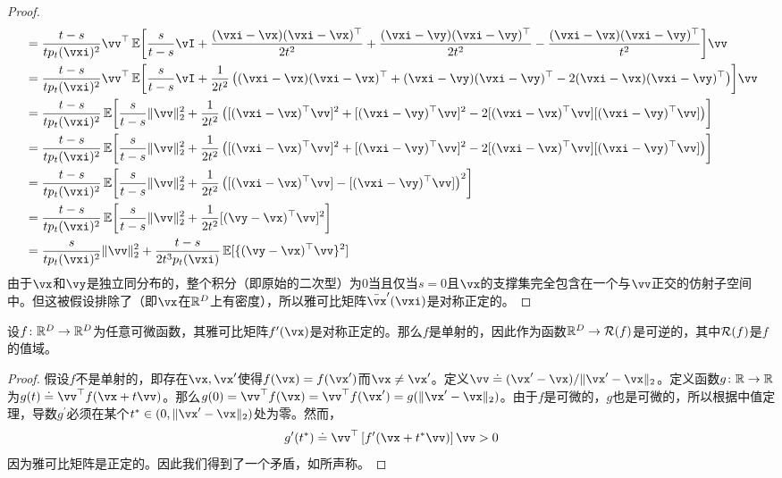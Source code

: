 \documentclass[../../book-main_zh.tex]{subfiles}
\begin{document}
\begin{proof}
\begin{align}
        &= \frac{t - s}{tp_{t}(\vxi)^{2}}\vv^{\top}\Ex\rs{\frac{s}{t - s}\vI +\frac{(\vxi - \vx)(\vxi - \vx)^{\top}}{2t^{2}} + \frac{(\vxi - \vy)(\vxi - \vy)^{\top}}{2t^{2}} - \frac{(\vxi - \vx)(\vxi - \vy)^{\top}}{t^{2}}}\vv \\
        &= \frac{t - s}{tp_{t}(\vxi)^{2}}\vv^{\top}\Ex\rs{\frac{s}{t - s}\vI +\frac{1}{2t^{2}}\bp{(\vxi - \vx)(\vxi - \vx)^{\top} + (\vxi - \vy)(\vxi - \vy)^{\top} - 2(\vxi - \vx)(\vxi - \vy)^{\top}}}\vv \\
        &= \frac{t - s}{tp_{t}(\vxi)^{2}}\Ex\rs{\frac{s}{t - s}\norm{\vv}_{2}^{2} +\frac{1}{2t^{2}}\bp{[(\vxi - \vx)^{\top}\vv]^{2} + [(\vxi - \vy)^{\top}\vv]^{2} - 2[(\vxi - \vx)^{\top}\vv][(\vxi - \vy)^{\top}\vv]}} \\
        &= \frac{t - s}{tp_{t}(\vxi)^{2}}\Ex\rs{\frac{s}{t - s}\norm{\vv}_{2}^{2} +\frac{1}{2t^{2}}\bp{[(\vxi - \vx)^{\top}\vv]^{2} + [(\vxi - \vy)^{\top}\vv]^{2} - 2[(\vxi - \vx)^{\top}\vv][(\vxi - \vy)^{\top}\vv]}} \\
        &= \frac{t - s}{tp_{t}(\vxi)^{2}}\Ex\rs{\frac{s}{t - s}\norm{\vv}_{2}^{2} +\frac{1}{2t^{2}}\bp{[(\vxi - \vx)^{\top}\vv] - [(\vxi - \vy)^{\top}\vv]}^{2}} \\
        &= \frac{t - s}{tp_{t}(\vxi)^{2}}\Ex\rs{\frac{s}{t - s}\norm{\vv}_{2}^{2} +\frac{1}{2t^{2}}[(\vy - \vx)^{\top}\vv]^{2}} \\
        &= \frac{s}{tp_{t}(\vxi)^{2}}\norm{\vv}_{2}^{2} + \frac{t - s}{2t^{3}p_{t}(\vxi)}\Ex[\{(\vy - \vx)^{\top}\vv\}^{2}]
    \end{align}
    由于\(\vx\)和\(\vy\)是独立同分布的，整个积分（即原始的二次型）为\(0\)当且仅当\(s = 0\)且\(\vx\)的支撑集完全包含在一个与\(\vv\)正交的仿射子空间中。但这被假设排除了（即\(\vx\)在\(\mathbb{R}^{D}\)上有密度），所以雅可比矩阵\(\bar{\vx}^{\prime}(\vxi)\)是对称正定的。
\end{proof}

\begin{lemma}\label{lem:gribonval_A2}
    设\(f \colon \mathbb{R}^{D} \to \mathbb{R}^{D}\)为任意可微函数，其雅可比矩阵\(f^{\prime}(\vx)\)是对称正定的。那么\(f\)是单射的，因此作为函数\(\mathbb{R}^{D} \to \mathcal{R}(f)\)是可逆的，其中\(\mathcal{R}(f)\)是\(f\)的值域。
\end{lemma}
\begin{proof}
    假设\(f\)不是单射的，即存在\(\vx, \vx^{\prime}\)使得\(f(\vx) = f(\vx^{\prime})\)而\(\vx \neq \vx^{\prime}\)。定义\(\vv \doteq (\vx^{\prime} - \vx)/\norm{\vx^{\prime} - \vx}_{2}\)。定义函数\(g \colon \mathbb{R} \to \mathbb{R}\)为\(g(t) \doteq \vv^{\top}f(\vx + t\vv)\)。那么\(g(0) = \vv^{\top}f(\vx) = \vv^{\top}f(\vx^{\prime}) = g(\norm{\vx^{\prime} - \vx}_{2})\)。由于\(f\)是可微的，\(g\)也是可微的，所以根据中值定理，导数\(g^{\prime}\)必须在某个\(t^{\ast} \in (0, \norm{\vx^{\prime} - \vx}_{2})\)处为零。然而，
    \begin{equation}
        g^{\prime}(t^{\ast}) \doteq \vv^{\top}\bs{f^{\prime}(\vx + t^{\ast}\vv)}\vv > 0
    \end{equation}
    因为雅可比矩阵是正定的。因此我们得到了一个矛盾，如所声称。
\end{proof}
\end{document}
